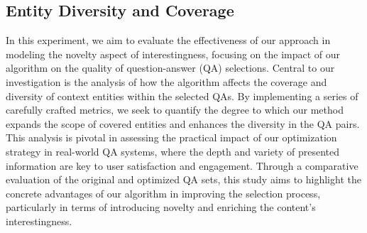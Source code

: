 \documentclass[11pt]{article}
\begin{document}
\subsection{Entity Diversity and Coverage}
\label{exp:1}
In this experiment, we aim to evaluate the effectiveness of our approach in modeling the novelty aspect of interestingness, focusing on the impact of our algorithm on the quality of question-answer (QA) selections. Central to our investigation is the analysis of how the algorithm affects the coverage and diversity of context entities within the selected QAs. By implementing a series of carefully crafted metrics, we seek to quantify the degree to which our method expands the scope of covered entities and enhances the diversity in the QA pairs. This analysis is pivotal in assessing the practical impact of our optimization strategy in real-world QA systems, where the depth and variety of presented information are key to user satisfaction and engagement. Through a comparative evaluation of the original and optimized QA sets, this study aims to highlight the concrete advantages of our algorithm in improving the selection process, particularly in terms of introducing novelty and enriching the content's interestingness.
\end{document}
